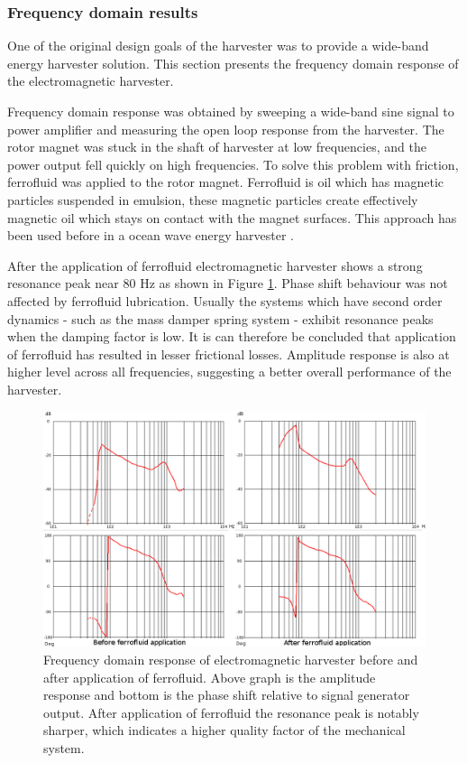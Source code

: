 \subsubsection{Frequency domain results} \label{sect:emh_fd}
One of the original design goals of the harvester was to provide a wide-band energy harvester solution. This section presents the frequency domain response of the electromagnetic harvester.

Frequency domain response was obtained by sweeping a wide-band sine signal to power amplifier and measuring the open loop response from the harvester. The rotor magnet was stuck in the shaft of harvester at low frequencies, and the power output fell quickly on high frequencies. To solve this problem with friction, ferrofluid was applied to the rotor magnet. Ferrofluid is oil which has magnetic particles suspended in emulsion, these magnetic particles create effectively magnetic oil which stays on contact with the magnet surfaces. This approach has been used before in a ocean wave energy harvester \cite{Cheung2009}.

 After the application of ferrofluid electromagnetic harvester shows a strong resonance peak near 80 Hz as shown in Figure \ref{fig:inductive_fd_dry}. Phase shift behaviour was not affected by ferrofluid lubrication. Usually the systems which have second order dynamics - such as the mass damper spring system - exhibit resonance peaks when the damping factor is low. It is can therefore be concluded that application of ferrofluid has resulted in lesser frictional losses. Amplitude response is also at higher level across all frequencies, suggesting a better overall performance of the harvester. 

\begin{figure}[htb]
\begin{center}
\includegraphics[width=\columnwidth]{images/own_measurement/generator_shaker/inductive_fd_combined.png}
\end{center}
\caption{\label{fig:inductive_fd_dry} Frequency domain response of electromagnetic harvester before and after application of ferrofluid. Above graph is the amplitude response and bottom is the phase shift relative to signal generator output. After application of ferrofluid the resonance peak is notably sharper, which indicates a higher quality factor of the mechanical system.}
\end{figure}

